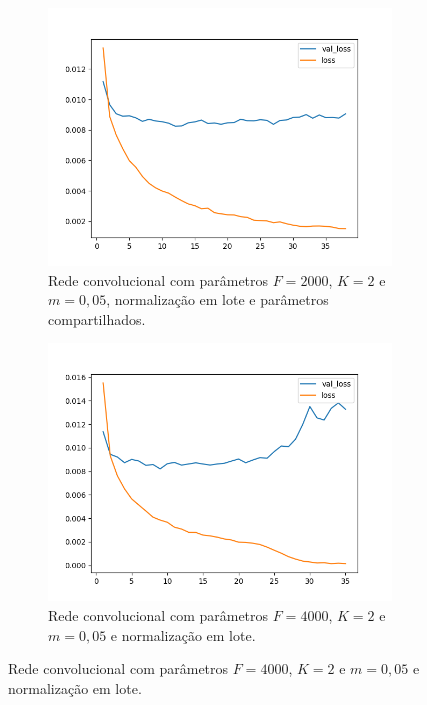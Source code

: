 \begin{figure}[H]
\begin{subfigure}{.5\textwidth}
  \label{fig:cnn-2000-k-2-m-005-normalizacao-em-lote-v2}
\end{subfigure}
\begin{subfigure}{.5\textwidth}
  \centering
  \caption{Rede convolucional com parâmetros $F = 2000$, $K = 2$ e $m = 0,05$, normalização em lote e parâmetros compartilhados.}
  \includegraphics[width=.8\linewidth]{figuras/ape-ajustes-hiper-parametros/shared-cnn-with-bn-2000-k-2-m-005.png}
  
  \label{fig:shared-cnn-2000-k-2-m-005-normalizacao-em-lote}
\end{subfigure}
\begin{subfigure}{.5\textwidth}
  \centering
  \caption{Rede convolucional com parâmetros $F = 4000$, $K = 2$ e $m = 0,05$ e normalização em lote.}
  \includegraphics[width=.8\linewidth]{figuras/ape-ajustes-hiper-parametros/cnn-with-bn-4000-k-2-m-005.png}
  

\end{subfigure}
\end{figure}
